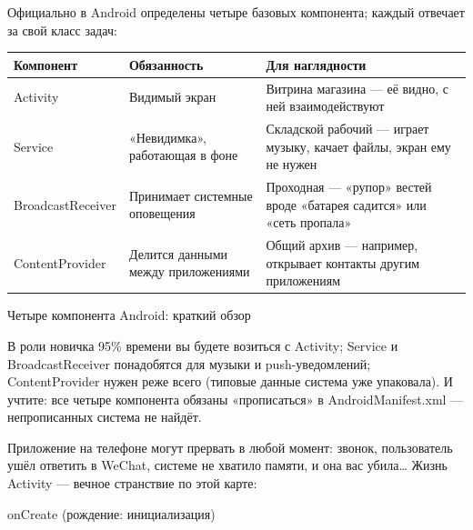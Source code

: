 


Официально в Android определены четыре базовых компонента; каждый отвечает за свой класс задач:

\begin{center}
\begin{tabularx}{\linewidth}{|X|X|X|}
\hline
\textbf{Компонент} & \textbf{Обязанность} & \textbf{Для наглядности} \tabularnewline
\hline
Activity & Видимый экран & Витрина магазина — её видно, с ней взаимодействуют \tabularnewline
Service & «Невидимка», работающая в фоне & Складской рабочий — играет музыку, качает файлы, экран ему не нужен \tabularnewline
BroadcastReceiver & Принимает системные оповещения & Проходная — «рупор» вестей вроде «батарея садится» или «сеть пропала» \tabularnewline
ContentProvider & Делится данными между приложениями & Общий архив — например, открывает контакты другим приложениям \tabularnewline
\hline
\end{tabularx}
\end{center}

\begin{center}\small\color{gray}Четыре компонента Android: краткий обзор\end{center}

В роли новичка 95\% времени вы будете возиться с Activity; Service и BroadcastReceiver понадобятся для музыки и push-уведомлений; ContentProvider нужен реже всего (типовые данные система уже упаковала). И учтите: все четыре компонента обязаны «прописаться» в AndroidManifest.xml — непрописанных система не найдёт.


Приложение на телефоне могут прервать в любой момент: звонок, пользователь ушёл ответить в WeChat, системе не хватило памяти, и она вас убила… Жизнь Activity — вечное странствие по этой карте:

onCreate (рождение: инициализация)

